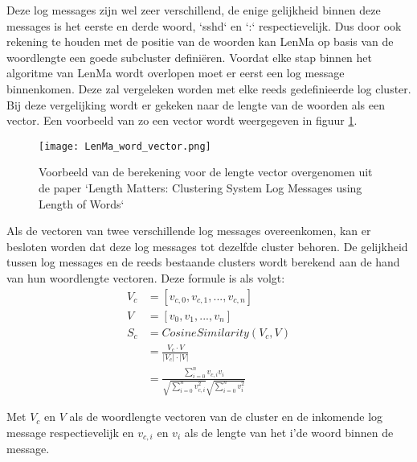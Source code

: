 Deze log messages zijn wel zeer verschillend, de enige gelijkheid binnen deze messages is het eerste en derde woord, `sshd` en `:` respectievelijk. Dus door ook rekening te houden met de positie van de woorden kan LenMa op basis van de woordlengte een goede subcluster definiëren. Voordat elke stap binnen het algoritme van LenMa wordt overlopen moet er eerst een log message binnenkomen. Deze zal vergeleken worden met elke reeds gedefinieerde log cluster. Bij deze vergelijking wordt er gekeken naar de lengte van de woorden als een vector. Een voorbeeld van zo een vector wordt weergegeven in figuur \ref{pic:LenMaberekening}.\\

\begin{figure}[!htp]
    \texttt{[image: LenMa\_word\_vector.png]}
    \caption{Voorbeeld van de berekening voor de lengte vector overgenomen uit de paper `Length Matters: Clustering System Log Messages using Length of Words` \autocite{shima2016length}}
    \label{pic:LenMaberekening}
\end{figure}

Als de vectoren van twee verschillende log messages overeenkomen, kan er besloten worden dat deze log messages tot dezelfde cluster behoren. De gelijkheid tussen log messages en de reeds bestaande clusters wordt berekend aan de hand van hun woordlengte vectoren. Deze formule is als volgt:
\begin{equation} \label{eq1}
    \begin{split}
        V_{c} & = [v_{c,0}, v_{c,1}, ... , v_{c,n}] \\
        V & = [v_{0}, v_{1}, ... , v_{n}] \\
        S_{c} & = CosineSimilarity(V_{c}, V) \\
        & = \frac{V_{c} \cdot V}{\lvert V_{c} \rvert \cdot \lvert V \rvert} \\
        & = \frac{\sum_{i=0}^{n} v_{c,i}v_{i}}{\sqrt{\sum_{i=0}^{n} v_{c,i}^{2}}\sqrt{\sum_{i=0}^{n} v_{i}^{2}}}
    \end{split}
\end{equation}

Met \(V_{c}\) en \(V\) als de woordlengte vectoren van de cluster en de inkomende log message respectievelijk en \(v_{c,i}\) en \(v_{i}\) als de lengte van het i'de woord binnen de message.\\

